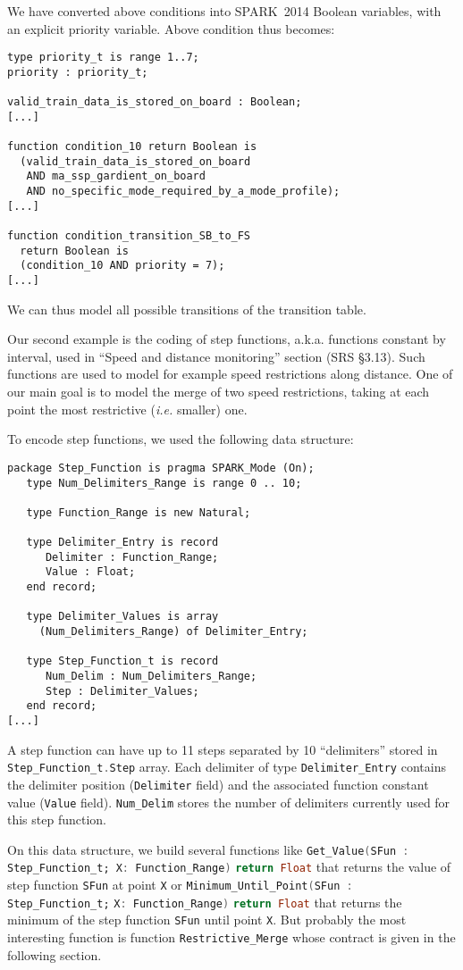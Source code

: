 \documentclass[10pt,a4paper,twocolumn]{article}
\newcommand{\newspark}{SPARK~2014\xspace}
\newcommand{\ie}{\textit{i.e.}\xspace}
\newcommand{\aka}{a.k.a.\xspace}
\newcommand{\SPARK}[1]{\lstinline[language=Ada,basicstyle={\footnotesize
      \sffamily},framesep=0pt]$#1$}
\begin{document}
We have converted above conditions into \newspark Boolean variables,
with an explicit priority variable. Above condition thus becomes:
\begin{lstlisting}
type priority_t is range 1..7;
priority : priority_t;

valid_train_data_is_stored_on_board : Boolean;
[...]

function condition_10 return Boolean is
  (valid_train_data_is_stored_on_board
   AND ma_ssp_gardient_on_board
   AND no_specific_mode_required_by_a_mode_profile);
[...]

function condition_transition_SB_to_FS
  return Boolean is
  (condition_10 AND priority = 7);
[...]
\end{lstlisting}

We can thus model all possible transitions of the transition table.

Our second example is the coding of step functions, \aka functions
constant by interval, used in ``Speed and distance monitoring''
section (SRS §3.13). Such functions are used to model for example
speed restrictions along distance. One of our main goal is to model
the merge of two speed restrictions, taking at each point the most
restrictive (\ie smaller) one.

To encode step functions, we used the following data structure:
\begin{lstlisting}
package Step_Function is pragma SPARK_Mode (On);
   type Num_Delimiters_Range is range 0 .. 10;

   type Function_Range is new Natural;

   type Delimiter_Entry is record
      Delimiter : Function_Range;
      Value : Float;
   end record;

   type Delimiter_Values is array
     (Num_Delimiters_Range) of Delimiter_Entry;

   type Step_Function_t is record
      Num_Delim : Num_Delimiters_Range;
      Step : Delimiter_Values;
   end record;
[...]
\end{lstlisting}

A step function can have up to 11 steps separated by 10 ``delimiters''
stored in \SPARK{Step_Function_t.Step} array. Each delimiter of type
\SPARK{Delimiter_Entry} contains the delimiter position
(\SPARK{Delimiter} field) and the associated function constant value
(\SPARK{Value} field). \SPARK{Num_Delim} stores the number
of delimiters currently used for this step function.

On this data structure, we build several functions like
\SPARK{Get_Value(SFun : Step_Function_t; X: Function_Range)}
\SPARK{return Float} that returns the value of step function
\SPARK{SFun} at point \SPARK{X} or \SPARK{Minimum_Until_Point(SFun :
  Step_Function_t;} \SPARK{X: Function_Range)} \SPARK{return Float}
that returns the minimum of the step function \SPARK{SFun} until point
\SPARK{X}. But probably the most interesting function is function
\SPARK{Restrictive_Merge} whose contract is given in the following
section.
\end{document}
